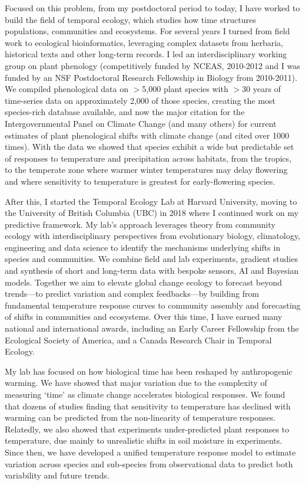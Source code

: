 \documentclass[11pt,letter,oneside]{article}
\begin{document}
Focused on this problem, from my postdoctoral period to today, I have worked to build the field of temporal ecology, which studies how time structures populations, communities and ecosystems. For several years I turned from field work to ecological bioinformatics, leveraging complex datasets from herbaria, historical texts and other long-term records. I led an interdisciplinary working group on plant phenology (competitively funded by NCEAS, 2010-2012 and I was funded by an NSF Postdoctoral Research Fellowship in Biology from 2010-2011). We compiled phenological data on \(>\)5,000 plant species with \(>\)30 years of time-series data on approximately 2,000 of those species, creating the most species-rich database available, and now the major citation for the Intergovernmental Panel on Climate Change (and many others) for current estimates of plant phenological shifts with climate change (and cited over 1000 times). With the data we showed that species exhibit a wide but predictable set of responses to temperature and precipitation across habitats, from the tropics, to the temperate zone where warmer winter temperatures may delay flowering and where sensitivity to temperature is greatest for early-flowering species. 

After this, I started the Temporal Ecology Lab at Harvard University, moving to the University of British Columbia (UBC) in 2018 where I continued work on my predictive framework. My lab's approach leverages theory from community ecology with interdisciplinary perspectives from evolutionary biology, climatology, engineering and data science to identify the mechanisms underlying shifts in species and communities. We combine field and lab experiments, gradient studies and synthesis of short and long-term data with bespoke sensors, AI and Bayesian models. Together we aim to elevate global change ecology to forecast beyond trends---to predict variation and complex feedbacks---by building from fundamental temperature response curves to community assembly and forecasting of shifts in communities and ecosystems. Over this time, I have earned many national and international awards, including an Early Career Fellowship from the Ecological Society of America, and a Canada Research Chair in Temporal Ecology.

My lab has focused on how biological time has been reshaped by anthropogenic warming. We have showed that major variation due to the complexity of measuring `time' as climate change accelerates biological responses. We found that dozens of studies finding that sensitivity to temperature has declined with warming can be predicted from the non-linearity of temperature responses. Relatedly, we also showed that experiments under-predicted  plant responses to temperature, due mainly to unrealistic shifts in soil moisture in experiments. Since then, we have developed a unified temperature response model to estimate variation across species and sub-species from observational data to predict both variability and future trends. 
\end{document}

